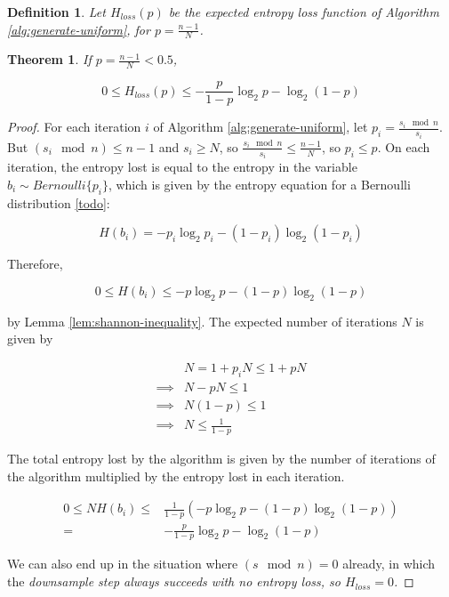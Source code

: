 \documentclass[12pt]{article}
\newtheorem{definition}{Definition}
\newtheorem{theorem}{Theorem}
\begin{document}
\begin{definition}
    Let $H_{loss}(p)$ be the expected entropy loss function of Algorithm \ref{alg:generate-uniform}, for $p=\frac{n-1}{N}$.
\end{definition}

\begin{theorem}
    \label{thm:loss}
If $p = \frac{n-1}{N} < 0.5$,

\begin{equation}
0 \le H_{loss}(p) \le -\frac{p}{1-p}\log_2p - \log_2(1-p)
\end{equation}

\end{theorem}

\begin{proof}
For each iteration $i$ of Algorithm \ref{alg:generate-uniform}, let $p_i = \frac{s_i \mod n}{s_i}$. But $(s_i \mod n) \le n-1$ and $s_i \ge N$, so $\frac{s_i \mod n}{s_i} \le \frac{n-1}{N}$, so $p_i \le p$. On each iteration, the entropy lost is equal to the entropy in the variable $b_i \sim Bernoulli\{p_i\}$, which is given by the entropy equation for a Bernoulli distribution \ref{todo}:

\begin{equation}
H(b_i) = -p_i\log_2p_i - (1-p_i)\log_2(1-p_i)
\end{equation}

Therefore, 

\begin{equation}
0 \le H(b_i) \le -p\log_2p - (1-p)\log_2(1-p) 
\end{equation}


by Lemma \ref{lem:shannon-inequality}. The expected number of iterations $N$ is given by

\begin{align}
& N = 1 + p_iN \le 1 + pN \\
\implies & N-pN \le 1 \\
\implies & N(1-p) \le 1 \\
\implies & N \le \frac{1}{1-p}
\end{align}

The total entropy lost by the algorithm is given by the number of iterations of the algorithm multiplied by the entropy lost in each iteration.

\begin{align}
0 \le NH(b_i) \le & \frac{1}{1-p}(-p\log_2p - (1-p)\log_2(1-p) ) \\
= & -\frac{p}{1-p}\log_2p - \log_2(1-p)
\end{align}

We can also end up in the situation where $(s \mod n) = 0$ already, in which the \em downsample \em step always succeeds with no entropy loss, so $H_{loss}=0$.
\end{proof}
\end{document}
